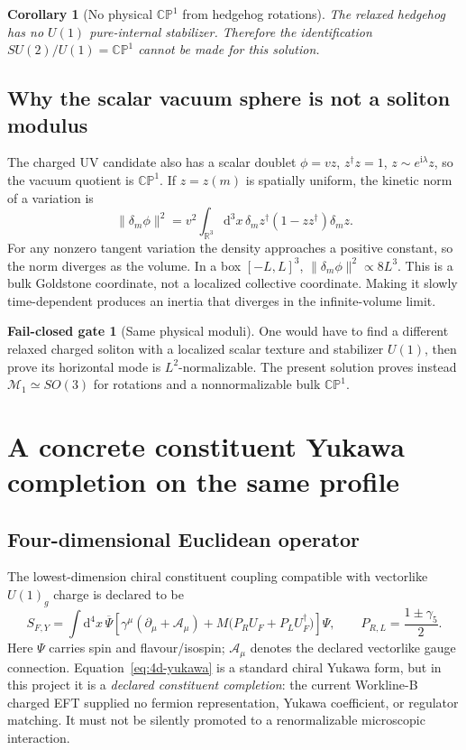 \documentclass[11pt]{article}
\newtheorem{corollary}[theorem]{Corollary}
\theoremstyle{definition}
\newtheorem{gate}[theorem]{Fail-closed gate}
\theoremstyle{remark}
\newcommand{\ii}{\mathrm i}
\newcommand{\dd}{\mathrm d}
\newcommand{\RR}{\mathbb R}
\newcommand{\CP}{\mathbb {CP}}
\newcommand{\cM}{\mathcal M}
\begin{document}
\begin{corollary}[No physical \(\CP^1\) from hedgehog rotations]
The relaxed hedgehog has no \(U(1)\) pure-internal stabilizer.  Therefore the
identification \(SU(2)/U(1)=\CP^1\) cannot be made for this solution.
\end{corollary}

\subsection{Why the scalar vacuum sphere is not a soliton modulus}

The charged UV candidate also has a scalar doublet
\(\phi=vz\), \(z^\dagger z=1\), \(z\sim e^{\ii\lambda}z\), so the vacuum
quotient is \(\CP^1\).  If \(z=z(m)\) is spatially uniform, the kinetic norm
of a variation is
\begin{equation}
 \|\delta_m\phi\|^2
 =v^2\int_{\RR^3}\dd^3x\,
 \delta_mz^\dagger(1-zz^\dagger)\delta_mz.
 \label{eq:bulk-norm}
\end{equation}
For any nonzero tangent variation the density approaches a positive
constant, so the norm diverges as the volume.  In a box
\([-L,L]^3\), \(\|\delta_m\phi\|^2\propto8L^3\).  This is a bulk Goldstone
coordinate, not a localized collective coordinate.  Making it slowly
time-dependent produces an inertia that diverges in the infinite-volume
limit.

\begin{gate}[Same physical moduli]
One would have to find a different relaxed charged soliton with a localized
scalar texture and stabilizer \(U(1)\), then prove its horizontal mode is
\(L^2\)-normalizable.  The present solution proves instead
\(\cM_1\simeq SO(3)\) for rotations and a nonnormalizable bulk \(\CP^1\).
\end{gate}

\section{A concrete constituent Yukawa completion on the same profile}

\subsection{Four-dimensional Euclidean operator}

The lowest-dimension chiral constituent coupling compatible with vectorlike
\(U(1)_g\) charge is declared to be
\begin{equation}
 S_{F,Y}=\int\dd^4x\,
 \overline\Psi\left[
 \gamma^\mu(\partial_\mu+\mathcal A_\mu)
 +M\bigl(P_RU_F+P_LU_F^\dagger\bigr)
 \right]\Psi,
 \qquad P_{R,L}=\frac{1\pm\gamma_5}{2}.
 \label{eq:4d-yukawa}
\end{equation}
Here \(\Psi\) carries spin and flavour/isospin; \(\mathcal A_\mu\) denotes the
declared vectorlike gauge connection.  Equation~\eqref{eq:4d-yukawa} is a
standard chiral Yukawa form, but in this project it is a \emph{declared
constituent completion}: the current Workline-B charged EFT supplied no fermion
representation, Yukawa coefficient, or regulator matching.  It must not be
silently promoted to a renormalizable microscopic interaction.
\end{document}
